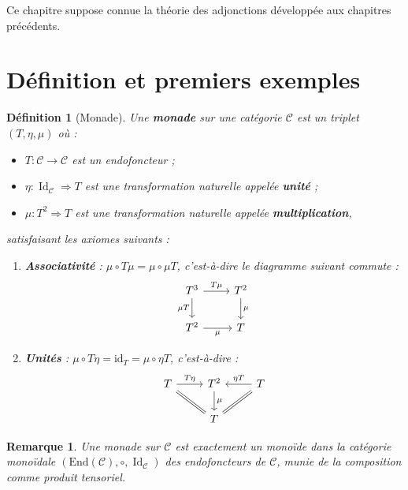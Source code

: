 \documentclass[a4paper,12pt]{book}
\DeclareMathOperator{\Id}{Id}
\newcommand{\id}{\mathrm{id}}
\newtheorem{definition}[theoreme]{Définition}
\newtheorem*{remarque}{Remarque}
\begin{document}
Ce chapitre suppose connue la théorie des adjonctions développée
aux chapitres précédents.

\section{Définition et premiers exemples}\label{sec:monades-def}

\begin{definition}[Monade]\label{def:monade}
Une \textbf{monade} sur une catégorie $\mathcal{C}$ est un triplet
$(T, \eta, \mu)$ où :
\begin{itemize}
    \item $T \colon \mathcal{C} \to \mathcal{C}$ est un endofoncteur ;
    \item $\eta \colon \Id_{\mathcal{C}} \Rightarrow T$ est une
    transformation naturelle appelée \textbf{unité} ;
    \item $\mu \colon T^2 \Rightarrow T$ est une transformation naturelle
    appelée \textbf{multiplication},
\end{itemize}
satisfaisant les axiomes suivants :
\begin{enumerate}[label=(\roman*)]
\item \textbf{Associativité} :
    $\mu \circ T\mu = \mu \circ \mu T$, c'est-à-dire le diagramme
    suivant commute :
\[
\begin{tikzcd}
T^3 \arrow[r, "T\mu"] \arrow[d, "\mu T"'] & T^2 \arrow[d, "\mu"] \\
T^2 \arrow[r, "\mu"'] & T
\end{tikzcd}
\]

\item \textbf{Unités} :
    $\mu \circ T\eta = \id_T = \mu \circ \eta T$, c'est-à-dire :
\[
\begin{tikzcd}
T \arrow[r, "T\eta"] \arrow[dr, equal] & T^2 \arrow[d, "\mu"] &
T \arrow[l, "\eta T"'] \arrow[dl, equal] \\
& T &
\end{tikzcd}
\]
\end{enumerate}
\end{definition}

\begin{remarque}\label{rem:monade-monoide}
Une monade sur $\mathcal{C}$ est exactement un monoïde dans la catégorie
monoïdale $(\mathrm{End}(\mathcal{C}), \circ, \Id_{\mathcal{C}})$
des endofoncteurs de $\mathcal{C}$, munie de la composition comme produit
tensoriel.
\end{remarque}
\end{document}
